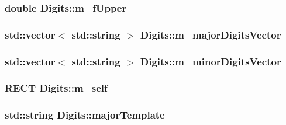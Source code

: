 \hypertarget{class_digits_aaadbe21fd0151547ad2aad4dadd82516}{
\subsubsection[{m\-\_\-f\-Upper}]{\setlength{\rightskip}{0pt plus 5cm}double Digits\-::m\-\_\-f\-Upper\hspace{0.3cm}{\ttfamily [protected]}}}\label{class_digits_aaadbe21fd0151547ad2aad4dadd82516}
\hypertarget{class_digits_a8f37710ae3695963c053ac86907b53c5}{
\subsubsection[{m\-\_\-major\-Digits\-Vector}]{\setlength{\rightskip}{0pt plus 5cm}std\-::vector$<$ std\-::string $>$ Digits\-::m\-\_\-major\-Digits\-Vector\hspace{0.3cm}{\ttfamily [protected]}}}\label{class_digits_a8f37710ae3695963c053ac86907b53c5}
\hypertarget{class_digits_a2382cd829aa6469431b38f447d9570d8}{
\subsubsection[{m\-\_\-minor\-Digits\-Vector}]{\setlength{\rightskip}{0pt plus 5cm}std\-::vector$<$ std\-::string $>$ Digits\-::m\-\_\-minor\-Digits\-Vector\hspace{0.3cm}{\ttfamily [protected]}}}\label{class_digits_a2382cd829aa6469431b38f447d9570d8}
\hypertarget{class_digits_ae4aaf160c1fb1a64da858021e376f84b}{
\subsubsection[{m\-\_\-self}]{\setlength{\rightskip}{0pt plus 5cm}R\-E\-C\-T Digits\-::m\-\_\-self\hspace{0.3cm}{\ttfamily [protected]}}}\label{class_digits_ae4aaf160c1fb1a64da858021e376f84b}
\hypertarget{class_digits_abbe65de11a5be175f825f2727212fe07}{
\subsubsection[{major\-Template}]{\setlength{\rightskip}{0pt plus 5cm}std\-::string Digits\-::major\-Template\hspace{0.3cm}{\ttfamily [protected]}}}\label{class_digits_abbe65de11a5be175f825f2727212fe07}
